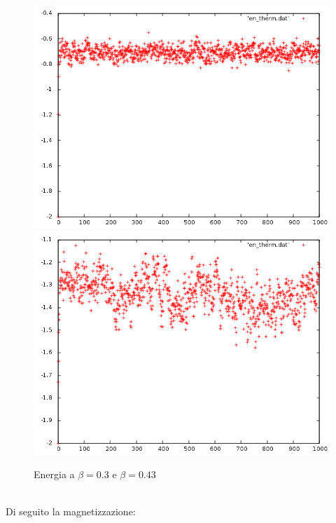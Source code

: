 \begin{figure}[h]
\includegraphics[scale=0.35]{metropolis/en_therm.png}
\includegraphics[scale=0.35]{metropolis/en_therm_crit.png}
\caption{Energia a $\beta=0.3$ e $\beta=0.43$}
\end{figure}
\\
Di seguito la magnetizzazione:\\
